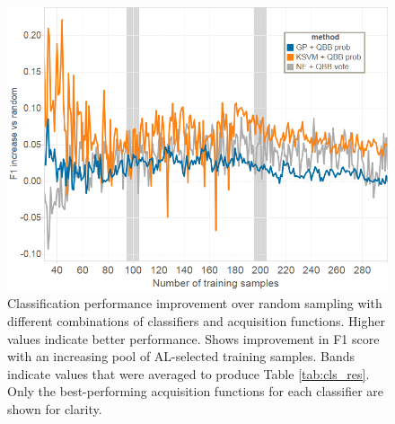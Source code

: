 \documentclass{sig-alternate}
\begin{document}
\begin{figure}[tb]
\centering
\includegraphics[width=\linewidth]{classification_experiment}
\caption{Classification performance improvement over random sampling with different combinations of classifiers and acquisition functions.
Higher values indicate better performance.
Shows improvement in F1 score with an increasing pool of AL-selected training samples.
Bands indicate values that were averaged to produce Table \ref{tab:cls_res}.
Only the best-performing acquisition functions for each classifier are shown for clarity.
}
\label{fig:cls_all}
\end{figure}
\end{document}
